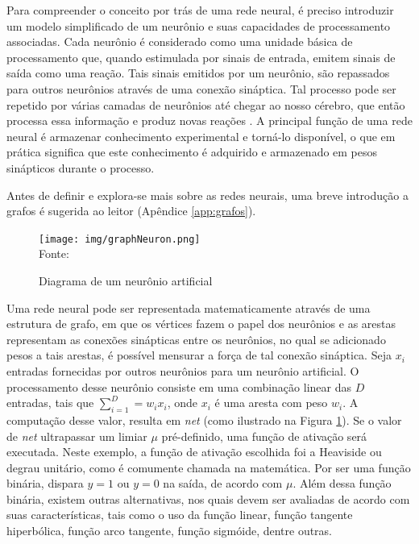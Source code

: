 Para compreender o conceito por trás de uma rede neural, é preciso introduzir um modelo simplificado de um neurônio e suas capacidades de processamento associadas. Cada neurônio é considerado como uma unidade básica de processamento que, quando estimulada por sinais de entrada, emitem sinais de saída como uma reação. Tais sinais emitidos por um neurônio, são repassados para outros neurônios através de uma conexão sináptica. Tal processo pode ser repetido por várias camadas de neurônios até chegar ao nosso cérebro, que então processa essa informação e produz novas reações \citep{baeza1999modern}. A principal função de uma rede neural é armazenar conhecimento experimental e torná-lo disponível, o que em prática significa que este conhecimento é adquirido e armazenado em pesos sinápticos durante o processo.

Antes de definir e explora-se mais sobre as redes neurais, uma breve introdução a grafos é sugerida ao leitor (Apêndice \ref{app:grafos}). 

\begin{figure}[ht!]
\caption{Diagrama de um neurônio artificial}
\label{fig:graphNeuron}
\centering
\texttt{[image: img/graphNeuron.png]}
{\fontsize{11pt}{\baselineskip}\selectfont
\\Fonte: \cite{Rauber2005}
}
\end{figure}

 Uma rede neural pode ser representada matematicamente através de uma estrutura de grafo, em que os vértices fazem o papel dos neurônios e as arestas representam as conexões sinápticas entre os neurônios, no qual se adicionado pesos a tais arestas, é possível mensurar a força de tal conexão sináptica. Seja $x_i$ entradas fornecidas por outros neurônios para um neurônio artificial. O processamento desse neurônio consiste em uma combinação linear das $D$ entradas, tais que $\sum_{i=1}^{D} = w_i x_i$, onde $x_i$ é uma aresta com peso $w_i$. A computação desse valor, resulta em \textit{net} (como ilustrado na Figura \ref{fig:graphNeuron}). Se o valor de \textit{net} ultrapassar um limiar $\mu$ pré-definido, uma função de ativação será executada. Neste exemplo, a função de ativação escolhida foi a Heaviside ou degrau unitário, como é comumente chamada na matemática. Por ser uma função binária, dispara $y = 1$ ou $y = 0$ na saída, de acordo com $\mu$. Além dessa função binária, existem outras alternativas, nos quais devem ser avaliadas de acordo com suas características, tais como o uso da função linear, função tangente hiperbólica, função arco tangente, função sigmóide, dentre outras.
 
